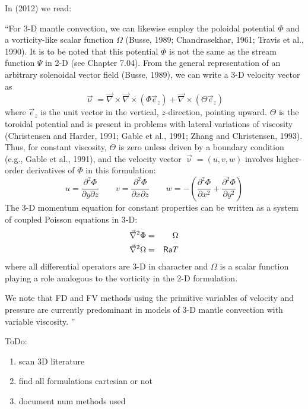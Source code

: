 \noindent In \textcite{zhym12} (2012) we read:
\begin{displayquote}
{\color{darkgray}
``For 3-D mantle convection, we can likewise employ the
poloidal potential $\Phi$ and a vorticity-like scalar function $\Omega$
(Busse, 1989; Chandrasekhar, 1961; Travis et al., 1990). It is
to be noted that this potential $\Phi$ is not the same as the stream
function $\Psi$ in 2-D (see Chapter 7.04). From the general representation 
of an arbitrary solenoidal vector field (Busse, 1989),
we can write a 3-D velocity vector as
\[
\vec\upnu = \vec\nabla \times \vec\nabla \times (\Phi \vec{e}_z) + \vec\nabla \times (\Theta \vec{e}_z)  
\]
where $\vec{e}_z$ is the unit vector in the vertical, $z$-direction, pointing upward.
$\Theta$ is the toroidal potential and is present in problems
with lateral variations of viscosity (Christensen and Harder,
1991; Gable et al., 1991; Zhang and Christensen, 1993).
Thus, for constant viscosity, $\Theta$ is zero unless driven by a
boundary condition (e.g., Gable et al., 1991), and the velocity
vector $\vec\upnu=(u,v,w)$ involves higher-order derivatives of $\Phi$ in this
formulation:
\[
u = \frac{\partial^2 \Phi}{\partial y\partial z}
\qquad
v = \frac{\partial^2 \Phi}{\partial x \partial z}
\qquad
w = - (\frac{\partial^2 \Phi}{\partial x^2} + \frac{\partial^2 \Phi}{\partial y^2})
\]
The 3-D momentum equation for constant properties can
be written as a system of coupled Poisson equations in 3-D:
\begin{eqnarray}
\vec\nabla^2 \Phi &=& \Omega \\
\vec\nabla^2 \Omega &=& {\mathsf{Ra}} T
\end{eqnarray}
where all differential operators are 3-D in character and $\Omega$ is a
scalar function playing a role analogous to the vorticity in the
2-D formulation.

We note that FD and FV methods using the primitive variables 
of velocity and pressure are currently predominant in
models of 3-D mantle convection with variable viscosity.
''}
\end{displayquote}


\vspace{0.5cm}




{\color{orange}
ToDo:
\begin{enumerate}
\item scan 3D literature 
\item find all formulations cartesian or not
\item document num methods used
\end{enumerate}
}

